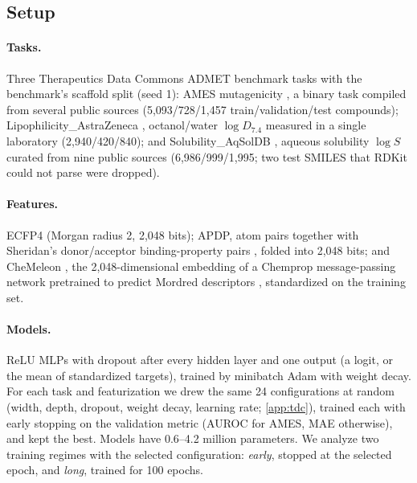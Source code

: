 \documentclass[10pt,twocolumn,letterpaper]{article}
\theoremstyle{definition}
\begin{document}
\subsection{Setup}\label{sec:tdc-setup}
\paragraph{Tasks.} Three Therapeutics Data Commons ADMET benchmark tasks \citep{huang2021} with the benchmark's scaffold split (seed 1): AMES mutagenicity \citep{xu2012}, a binary task compiled from several public sources (5{,}093/728/1{,}457 train/validation/test compounds); Lipophilicity\_AstraZeneca \citep{astrazeneca2016,wu2018}, octanol/water $\log D_{7.4}$ measured in a single laboratory (2{,}940/420/840); and Solubility\_AqSolDB \citep{sorkun2019}, aqueous solubility $\log S$ curated from nine public sources (6{,}986/999/1{,}995; two test SMILES that RDKit could not parse were dropped).

\paragraph{Features.} ECFP4 \citep{rogers2010} (Morgan radius 2, 2{,}048 bits); APDP, atom pairs \citep{carhart1985} together with Sheridan's donor/acceptor binding-property pairs \citep{kearsley1996,sheridan2019}, folded into 2{,}048 bits; and CheMeleon \citep{burns2025}, the 2{,}048-dimensional embedding of a Chemprop message-passing network \citep{heid2024} pretrained to predict Mordred descriptors \citep{moriwaki2018}, standardized on the training set.

\paragraph{Models.} ReLU MLPs with dropout \citep{srivastava2014} after every hidden layer and one output (a logit, or the mean of standardized targets), trained by minibatch Adam with weight decay. For each task and featurization we drew the same 24 configurations at random (width, depth, dropout, weight decay, learning rate; \cref{app:tdc}), trained each with early stopping on the validation metric (AUROC for AMES, MAE otherwise), and kept the best. Models have 0.6--4.2 million parameters. We analyze two training regimes with the selected configuration: \emph{early}, stopped at the selected epoch, and \emph{long}, trained for 100 epochs.
\end{document}
